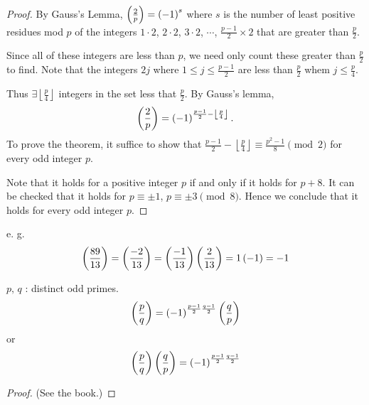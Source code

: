 \begin{proof}
    By Gauss's Lemma, $\left(\frac{2}{p}\right)=\left(-1\right)^s$
    where $s$ is the number of least positive residues mod $p$ of the integers $1\cdot 2$,
    $2 \cdot 2$, $3 \cdot 2$, $\cdots$, $\frac{p-1}{2}\times 2$ that are greater than $\frac{p}{2}$.  
    
    Since all of these integers are less than $p$, we need only count these greater than $\frac{p}{2}$ to find.
    Note that the integers $2j$ where $1\leq j\leq \frac{p-1}{2}$ are less than $\frac{p}{2}$ whem
    $j \leq \frac{p}{4}$.

    Thus $\exists \left\lfloor\frac{p}{4}\right\rfloor$ integers in the set less
    that $\frac{p}{2}$. By Gauss's lemma,
    \[
        \left(\frac{2}{p}\right) = \left(-1\right)^{\frac{p-1}{2} - \left\lfloor\frac{p}{4}\right\rfloor}.
    \]
    To prove the theorem, it suffice to show that $\frac{p-1}{2} - \left\lfloor\frac{p}{4}\right\rfloor \equiv \frac{p^2-1}{8} \pmod{2}$
    for every odd integer $p$.

    Note that it holds for a positive integer $p$ if and only if it holds for $p+8$.
    It can be checked that it holds for $p\equiv\pm 1$, $p\equiv\pm 3 \pmod{8}$.
    Hence we conclude that it holds for every odd integer $p$.
\end{proof}

e. g. 
\[
    \left(\frac{89}{13}\right)=\left(\frac{-2}{13}\right)=\left(\frac{-1}{13}\right)\left(\frac{2}{13}\right)
    = 1\left(-1\right) =-1
\]

\begin{theorem}
    $p,\,q$ : distinct odd primes.
    \[
        \left(\frac{p}{q}\right)=\left(-1\right)^{\frac{p-1}{2}\frac{q-1}{2}}\left(\frac{q}{p}\right)
    \]
    or
    \[
        \left(\frac{p}{q}\right)\left(\frac{q}{p}\right) = \left(-1\right)^{\frac{p-1}{2}\frac{q-1}{2}}
    \]
\end{theorem}

\begin{proof}
    (See the book.)
\end{proof}

